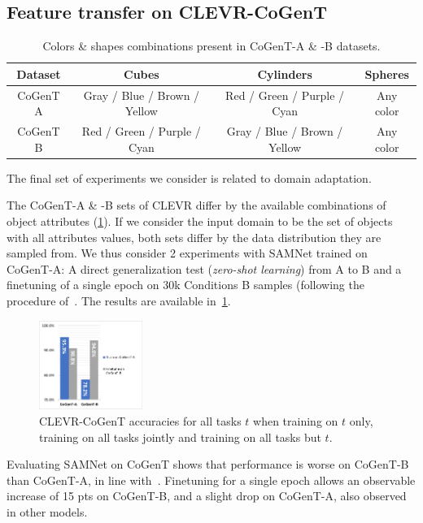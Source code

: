 \subsection{Feature transfer on CLEVR-CoGenT}
\label{sec:feature}
\begin{table}[ht]
	\label{tab:cogent_conditions}
	\centering
	\begin{adjustbox}{width=0.45\textwidth}
		\begin{tabular}{cccc}
			\toprule
			Dataset	& Cubes	& Cylinders &	Spheres	\\
			\midrule
			CoGenT A & Gray / Blue / Brown / Yellow  & Red / Green / Purple / Cyan	&	Any color  \\
			CoGenT B	&	Red / Green / Purple / Cyan &	Gray / Blue / Brown / Yellow	&	Any color \\
			\bottomrule
		\end{tabular}
	\end{adjustbox}
	\caption{Colors \& shapes combinations present in CoGenT-A \& -B datasets.}
\end{table}

The final set of experiments we consider is related to domain adaptation. %

The CoGenT-A \& -B sets of CLEVR differ by the available combinations of object attributes (\cref{tab:cogent_conditions}). If we consider the input domain to be the set of objects with all attributes values, both sets differ by the data distribution they are sampled from. We thus consider 2 experiments with SAMNet trained on CoGenT-A: A direct generalization test (\emph{zero-shot learning}) from A to B and a finetuning of a single epoch on 30k Conditions B samples (following the procedure of~\cite{johnson2017inferring, mascharka2018transparency, perez2018film, marois2018transfer}. The results are available in~\cref{fig:CoGenT-B-results}.

\begin{figure}[!t]\vspace{5pt}
	\centering
	\includegraphics[width=0.3\textwidth]{img/results/CoGenT_B_results.pdf}
	\caption{CLEVR-CoGenT accuracies for all tasks $t$ when training on $t$ only, training on all tasks jointly and training on all tasks but $t$.} %
	\label{fig:CoGenT-B-results}
\end{figure}
Evaluating SAMNet on CoGenT shows that performance is worse on CoGenT-B than CoGenT-A, in line with~\cite{johnson2017inferring, mascharka2018transparency, perez2018film}. Finetuning for a single epoch allows an observable increase of 15 pts on CoGenT-B, and a slight drop on CoGenT-A, also observed in other models.